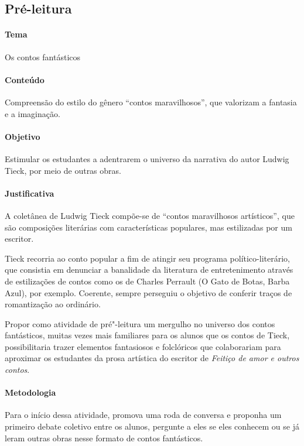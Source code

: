 \documentclass[12pt]{extarticle}
\begin{document}

\subsection{Pré-leitura}


\paragraph{Tema} Os contos fantásticos

\paragraph{Conteúdo} Compreensão do estilo do gênero ``contos maravilhosos'', 
que valorizam a fantasia e a imaginação. 

\paragraph{Objetivo} Estimular os estudantes a adentrarem o universo da narrativa 
do autor Ludwig Tieck, por meio de outras obras.

\paragraph{Justificativa} A coletânea de Ludwig Tieck compõe-se de ``contos
maravilhosos artísticos'', que são composições literárias com
características populares, mas estilizadas por um escritor.

Tieck recorria ao conto popular
a fim de atingir seu programa político-literário, que consistia
em denunciar a banalidade da literatura de entretenimento
através de estilizações de contos como os de Charles Perrault
(O Gato de Botas, Barba Azul), por exemplo. Coerente, sempre perseguiu
o objetivo de conferir traços de romantização ao ordinário.

Propor como atividade de pré"-leitura um mergulho no universo dos contos 
fantásticos, muitas vezes mais familiares para os alunos que os contos de Tieck, 
possibilitaria trazer elementos fantasiosos e folclóricos que colaborariam para
aproximar os estudantes da prosa artística do escritor de \textit{Feitiço de amor e outros contos}.

\paragraph{Metodologia}
Para o início dessa atividade, promova uma roda de conversa e proponha um primeiro debate
coletivo entre os alunos, pergunte a eles se eles conhecem ou se já leram outras obras 
nesse formato de contos fantásticos.
\end{document}
